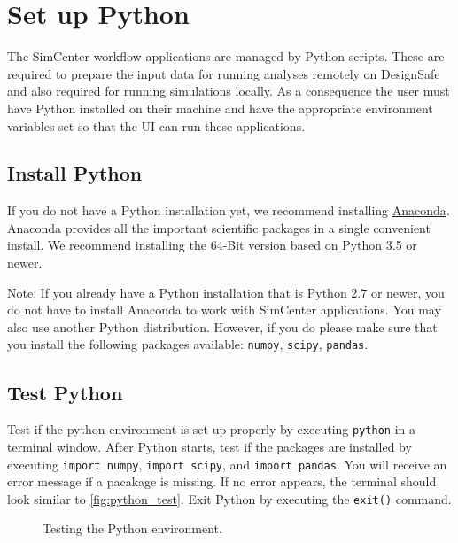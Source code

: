 \section{Set up Python}

The SimCenter workflow applications are managed by Python scripts. These are required to prepare the input data for running analyses remotely on DesignSafe and also required for running simulations locally. As a consequence the user must have Python installed on their machine and have the appropriate environment variables set so that the UI can run these applications.

\subsection{Install Python}

If you do not have a Python installation yet, we recommend installing \href{http://www.anaconda.com/distribution/#download-section}{Anaconda}. Anaconda provides all the important scientific packages in a single convenient install. We recommend installing the 64-Bit version based on Python 3.5 or newer.

Note: If you already have a Python installation that is Python 2.7 or newer, you do not have to install Anaconda to work with SimCenter applications. You may also use another Python distribution. However, if you do  please make sure that you install the following packages available: \texttt{numpy}, \texttt{scipy}, \texttt{pandas}.

\subsection{Test Python}

Test if the python environment is set up properly by executing \texttt{python} in a terminal window. After Python starts, test if the packages are installed by executing \texttt{import numpy}, \texttt{import scipy}, and \texttt{import pandas}. You will receive an error message if a pacakage is missing. If no error appears, the terminal should look similar to \autoref{fig:python_test}. Exit Python by executing the \texttt{exit()} command.

\begin{figure}[!htbp]
  \caption{Testing the Python environment.}
  \label{fig:python_test}
\end{figure}

